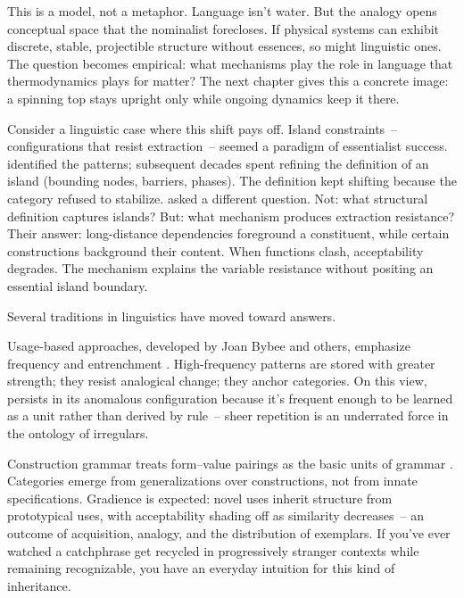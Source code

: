 This is a model, not a metaphor. Language isn't water. But the analogy opens conceptual space that the nominalist forecloses. If physical systems can exhibit discrete, stable, projectible structure without essences, so might linguistic ones. The question becomes empirical: what mechanisms play the role in language that thermodynamics plays for matter? The next chapter gives this a concrete image: a spinning top stays upright only while ongoing dynamics keep it there.

Consider a linguistic case where this shift pays off. Island constraints~-- configurations that resist extraction~-- seemed a paradigm of essentialist success. \textcite{ross1967} identified the patterns; subsequent decades spent refining the definition of an island (bounding nodes, barriers, phases). The definition kept shifting because the category refused to stabilize. \textcite{cuneogoldberg2023Discourse} asked a different question. Not: what structural definition captures islands? But: what mechanism produces extraction resistance? Their answer: long-distance dependencies foreground a constituent, while certain constructions background their content. When functions clash, acceptability degrades. The mechanism explains the variable resistance without positing an essential island boundary.


Several traditions in linguistics have moved toward answers.

Usage-based approaches, developed by Joan Bybee and others, emphasize frequency and entrenchment \citep{bybee2010}. High-frequency patterns are stored with greater strength; they resist analogical change; they anchor categories. On this view,  persists in its anomalous configuration because it's frequent enough to be learned as a unit rather than derived by rule~-- sheer repetition is an underrated force in the ontology of irregulars.

Construction grammar treats form--value pairings as the basic units of grammar \citep{goldberg1995constructions}. Categories emerge from generalizations over constructions, not from innate specifications. Gradience is expected: novel uses inherit structure from prototypical uses, with acceptability shading off as similarity decreases~-- an outcome of acquisition, analogy, and the distribution of exemplars. If you've ever watched a catchphrase get recycled in progressively stranger contexts while remaining recognizable, you have an everyday intuition for this kind of inheritance.

